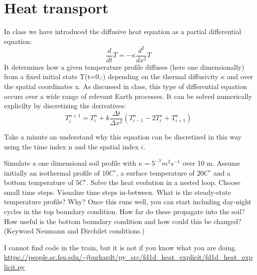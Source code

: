 \section{Heat transport}
In class we have introduced the diffusive heat equation as a partial differential equation:
$$
\frac{d}{dt}T = -\kappa\frac{d^2}{dx^2}T
$$
It determines how a given temperature profile diffuses (here one dimensionally) from a fixed initial state T(t=0,:) depending on the thermal diffusivity $\kappa$ and over the spatial coordinates x. As discussed in class, this type of differential equation occurs over a wide range of relevant Earth processes. It can be solved numerically explicilty by discretizing the derivatives:
$$
T^{n+1}_{i} = T^{n}_{i} + k\frac{\Delta t}{\Delta x^2}\left(T^{n}_{i-1} - 2T^{n}_{i}+T^{n}_{i+1} \right)
$$

Take a minute an understand why this equation can be discretized in this way using the time index n and the spatial index $i$. 

Simulate a one dimensional soil profile with $\kappa = 5^{-7} m^2 s^{-1}$ over 10 m. Assume initially an isothermal profile of $10 C^{\circ}$, a surface temperature of $20 C^{\circ}$ and a bottom temperature of $5 C^{\circ}$. Solve the heat evolution in a nested loop. Choose small time steps. Visualize time steps in-between. What is the steady-state temperature profile? Why? Once this runs well, you can start including day-night cycles in the top boundary condition. How far do these propagate into the soil? How useful is the bottom boundary condition and how could this be changed? (Keyword Neumann and Dirchilet conditions.)

\ifanswers
\begin{tcolorbox}[enhanced jigsaw,breakable,pad at break*=1mm,
    colback=blue!5!white,colframe=babyblueeyes,title=Solutions,
    watermark color=white]

I cannot find code in the train, but it is not if you know what you are doing. 
\url{https://people.sc.fsu.edu/~jburkardt/py_src/fd1d_heat_explicit/fd1d_heat_explicit.py}
\end{tcolorbox}
\fi
